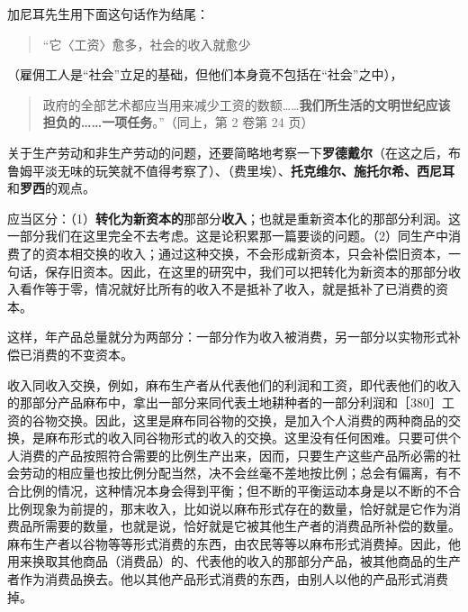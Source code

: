 加尼耳先生用下面这句话作为结尾：

\begin{quote}“它〈工资〉愈多，社会的收入就愈少\end{quote}

（雇佣工人是“社会”立足的基础，但他们本身竟不包括在“社会”之中），

\begin{quote}政府的全部艺术都应当用来减少工资的数额……\textbf{我们所生活的文明世纪应该担负的……一项任务}。”（同上，第 2 卷第 24 页）\end{quote}


关于生产劳动和非生产劳动的问题，还要简略地考察一下\textbf{罗德戴尔}（在这之后，布鲁姆平淡无味的玩笑就不值得考察了）、（费里埃）、\textbf{托克维尔、施托尔希、西尼耳}和\textbf{罗西}的观点。


\fontbox{~\{}应当区分：（1）\textbf{转化为新资本的}那部分\textbf{收入}；也就是重新资本化的那部分利润。这一部分我们在这里完全不去考虑。这是论积累那一篇要谈的问题。（2）同生产中消费了的资本相交换的收入；通过这种交换，不会形成新资本，只会补偿旧资本，一句话，保存旧资本。因此，在这里的研究中，我们可以把转化为新资本的那部分收入看作等于零，情况就好比所有的收入不是抵补了收入，就是抵补了已消费的资本。

这样，年产品总量就分为两部分：一部分作为收入被消费，另一部分以实物形式补偿已消费的不变资本。

收入同收入交换，例如，麻布生产者从代表他们的利润和工资，即代表他们的收入的那部分产品麻布中，拿出一部分来同代表土地耕种者的一部分利润和［380］工资的谷物交换。因此，这里是麻布同谷物的交换，是加入个人消费的两种商品的交换，是麻布形式的收入同谷物形式的收入的交换。这里没有任何困难。只要可供个人消费的产品按照符合需要的比例生产出来，因而，只要生产这些产品所必需的社会劳动的相应量也按比例分配\fontbox{~\{}当然，决不会丝毫不差地按比例；总会有偏离，有不合比例的情况，这种情况本身会得到平衡；但不断的平衡运动本身是以不断的不合比例现象为前提的\fontbox{\}~}，那末收入，比如说以麻布形式存在的数量，恰好就是它作为消费品所需要的数量，也就是说，恰好就是它被其他生产者的消费品所补偿的数量。麻布生产者以谷物等等形式消费的东西，由农民等等以麻布形式消费掉。因此，他用来换取其他商品（消费品）的、代表他的收入的那部分产品，被其他商品的生产者作为消费品换去。他以其他产品形式消费的东西，由别人以他的产品形式消费掉。

